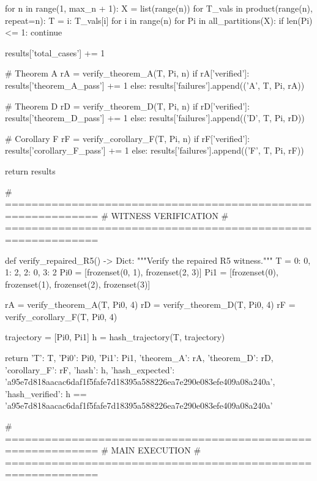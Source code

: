     for n in range(1, max_n + 1):
        X = list(range(n))
        for T_vals in product(range(n), repeat=n):
            T = {i: T_vals[i] for i in range(n)}
            for Pi in all_partitions(X):
                if len(Pi) <= 1:
                    continue
                
                results['total_cases'] += 1
                
                # Theorem A
                rA = verify_theorem_A(T, Pi, n)
                if rA['verified']:
                    results['theorem_A_pass'] += 1
                else:
                    results['failures'].append(('A', T, Pi, rA))
                
                # Theorem D
                rD = verify_theorem_D(T, Pi, n)
                if rD['verified']:
                    results['theorem_D_pass'] += 1
                else:
                    results['failures'].append(('D', T, Pi, rD))
                
                # Corollary F
                rF = verify_corollary_F(T, Pi, n)
                if rF['verified']:
                    results['corollary_F_pass'] += 1
                else:
                    results['failures'].append(('F', T, Pi, rF))
    
    return results

# ============================================================
# WITNESS VERIFICATION
# ============================================================

def verify_repaired_R5() -> Dict:
    """Verify the repaired R5 witness."""
    T = {0: 0, 1: 2, 2: 0, 3: 2}
    Pi0 = [frozenset({0, 1}), frozenset({2, 3})]
    Pi1 = [frozenset({0}), frozenset({1}), frozenset({2}), frozenset({3})]
    
    rA = verify_theorem_A(T, Pi0, 4)
    rD = verify_theorem_D(T, Pi0, 4)
    rF = verify_corollary_F(T, Pi0, 4)
    
    trajectory = [Pi0, Pi1]
    h = hash_trajectory(T, trajectory)
    
    return {
        'T': T,
        'Pi0': Pi0,
        'Pi1': Pi1,
        'theorem_A': rA,
        'theorem_D': rD,
        'corollary_F': rF,
        'hash': h,
        'hash_expected': 'a95e7d818aacac6daf1f5fafe7d18395a588226ea7e290e083efe409a08a240a',
        'hash_verified': h == 'a95e7d818aacac6daf1f5fafe7d18395a588226ea7e290e083efe409a08a240a'
    }

# ============================================================
# MAIN EXECUTION
# ============================================================


